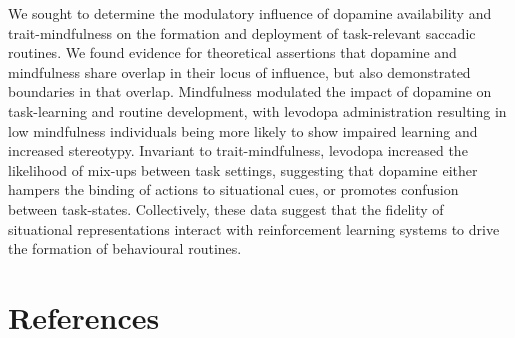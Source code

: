 \documentclass{article}
\begin{document}
We sought to determine the modulatory influence of dopamine availability
and trait-mindfulness on the formation and deployment of task-relevant
saccadic routines. We found evidence for theoretical assertions that
dopamine and mindfulness share overlap in their locus of influence, but
also demonstrated boundaries in that overlap. Mindfulness modulated the
impact of dopamine on task-learning and routine development, with
levodopa administration resulting in low mindfulness individuals being
more likely to show impaired learning and increased stereotypy.
Invariant to trait-mindfulness, levodopa increased the likelihood of
mix-ups between task settings, suggesting that dopamine either hampers
the binding of actions to situational cues, or promotes confusion
between task-states. Collectively, these data suggest that the fidelity
of situational representations interact with reinforcement learning
systems to drive the formation of behavioural routines.

\hypertarget{references}{%
\section*{References}\label{references}}
\end{document}
